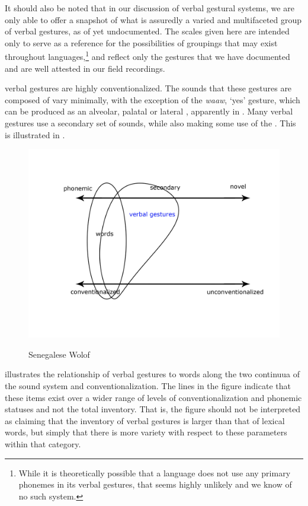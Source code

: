 \documentclass[output=paper
,newtxmath
,modfonts
,nonflat]{langsci/langscibook}
\begin{document}
It should also be noted that in our discussion of verbal gestural systems, we are only able to offer a snapshot of what is  assuredly a varied and multifaceted group of verbal gestures, as of yet undocumented. The scales given here are intended only to serve as a reference for the possibilities of groupings that may exist throughout languages,\footnote{While it is theoretically possible that a language does not use any primary phonemes in its verbal gestures,  that seems highly unlikely and we know of no such system.} and reflect only the gestures that we have documented and are well attested in our field recordings. 

 verbal gestures are highly conventionalized. The sounds that these gestures are composed of vary minimally, with the exception of the \textit{waaw}, `yes' gesture, which can be produced as an alveolar, palatal or lateral , apparently in . Many  verbal gestures use a secondary set of sounds, while also making some use of the . This is illustrated in .  
	
\begin{figure}  
\includegraphics[scale=0.13]{figures/senegalsystem.jpg}\\
\caption{Senegalese Wolof}
\label{fig:pillion:senegal}
\end{figure}
\noindent
{} illustrates the relationship of verbal gestures to words along the two continuua of the sound system and conventionalization.  The lines in the figure indicate that these items exist over a wider range of levels of conventionalization and phonemic statuses and not the total inventory. That is, the figure should not be interpreted as claiming that the inventory of verbal gestures is larger than that of lexical words, but simply that there is more variety with respect to these parameters within that category. 
\end{document}
